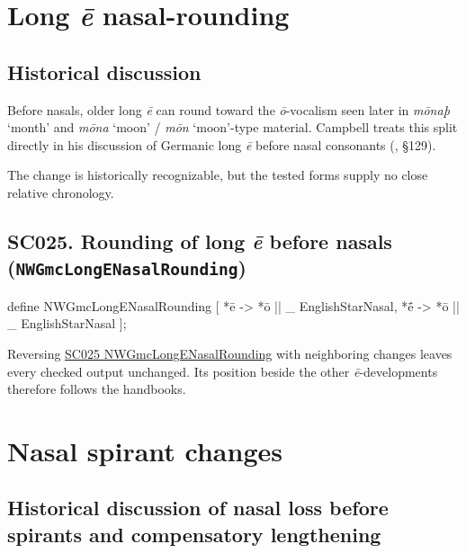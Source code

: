 \documentclass[
  british,
  a4paper,
  openany]{book}
\providecommand{\texorpdfstring}[2]{#1}
\begin{document}
\newpage

\section{\texorpdfstring{Long \emph{ē}
nasal-rounding}{Long  nasal-rounding}}\label{long-nasal-rounding}

\subsection{Historical discussion}\label{historical-discussion-18}

Before nasals, older long \emph{ē} can round toward the
\emph{ō}-vocalism seen later in \emph{mōnaþ} `month' and \emph{mōna}
`moon' / \emph{mōn} `moon'-type material. Campbell treats this split
directly in his discussion of Germanic long \emph{ē} before nasal
consonants (, §129).

The change is historically recognizable, but the tested forms supply no
close relative chronology.

\subsection{\texorpdfstring{SC025. Rounding of long \emph{ē} before
nasals
(\texttt{NWGmcLongENasalRounding})}{SC025. Rounding of long  before nasals (NWGmcLongENasalRounding)}}\label{rule-NWGmcLongENasalRounding}

\begin{ReaderFacingFoma}
define NWGmcLongENasalRounding [
    {*ē} -> {*ō} || _ EnglishStarNasal,
    {*ḗ} -> {*ō} || _ EnglishStarNasal
];
\end{ReaderFacingFoma}

Reversing \hyperref[rule-NWGmcLongENasalRounding]{SC025
NWGmcLongENasalRounding} with neighboring changes leaves every checked
output unchanged. Its position beside the other \emph{ē}-developments
therefore follows the handbooks.

\newpage

\section{Nasal spirant changes}\label{nasal-spirant-changes}

\subsection{Historical discussion of nasal loss before spirants and
compensatory
lengthening}\label{historical-discussion-of-nasal-loss-before-spirants-and-compensatory-lengthening}
\end{document}
